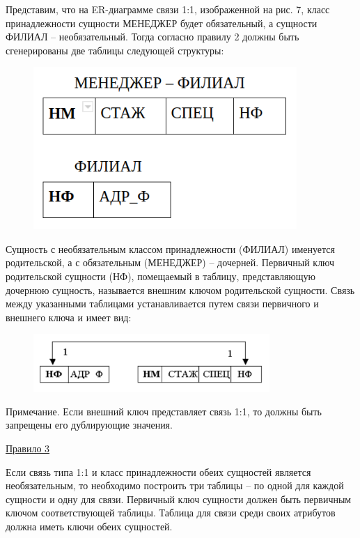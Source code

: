 \begin{enumerate}
    Представим, что на ER-диаграмме связи 1:1, изображенной на рис. 7, класс принадлежности сущности МЕНЕДЖЕР
    будет обязательный, а сущности ФИЛИАЛ – необязательный. Тогда согласно правилу 2 должны быть сгенерированы
    две таблицы следующей структуры:

    \begin{figure}[H]
        \centering
        \includegraphics[width=100mm]{assets/security/pic5.png}
        \label{fig:mesh07}
    \end{figure}

    Сущность с необязательным классом принадлежности (ФИЛИАЛ) именуется родительской, а с обязательным (МЕНЕДЖЕР)
    – дочерней. Первичный ключ родительской сущности (НФ), помещаемый в таблицу, представляющую дочернюю сущность,
    называется внешним ключом родительской сущности. Связь между указанными таблицами устанавливается путем связи
    первичного и внешнего ключа и имеет вид:

    \begin{figure}[H]
        \centering
        \includegraphics[width=0.8\textwidth]{assets/security/pic6.png}
        \label{fig:mesh08}
    \end{figure}

    Примечание. Если внешний ключ представляет связь 1:1, то должны быть запрещены его дублирующие значения.

    \underline{Правило 3}

    Если связь типа 1:1 и класс принадлежности обеих сущностей является необязательным, то необходимо построить
    три таблицы – по одной для каждой сущности и одну для связи. Первичный ключ сущности должен быть первичным
    ключом соответствующей таблицы. Таблица для связи среди своих атрибутов должна иметь ключи обеих сущностей.


\end{enumerate}
